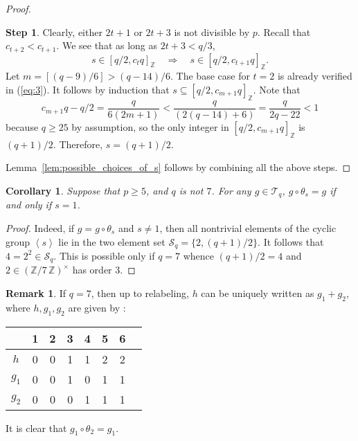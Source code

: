 \documentclass{amsart}[11pt]
\newtheorem{cor}[thm]{Corollary}
\theoremstyle{definition}
\newtheorem{rem}[thm]{Remark}
\newtheorem{step}{Step}
\numberwithin{equation}{section}
\theoremstyle{notitle}
\begin{document}
\begin{proof}
\begin{step}
Clearly, either $2t+1$ or $2t+3$ is not divisible by $p$. Recall that
$c_{t+2}< c_{t+1}$. We see that as long as $2t+3<q/3$,
\[ s\in [q/2, c_tq]_{\mathbb{Z}} \quad \Longrightarrow \quad s\in [q/2,
c_{t+1}q]_{\mathbb{Z}}.\] Let $m=[(q-9)/6]>(q-14)/6$. The base case for
$t=2$ is already verified in (\ref{eq:3}). It follows by induction
that $s\subseteq [q/2, c_{m+1}q]_{\mathbb{Z}}$. Note that
\[ c_{m+1}q-q/2= \frac{q}{6(2m+1)}<
\frac{q}{(2(q-14)+6)}=\frac{q}{2q-22}<1\] because $q\geq 25$ by
assumption, so the only integer in $[q/2, c_{m+1}q]_{\mathbb{Z}}$ is
$(q+1)/2$. Therefore, $s=(q+1)/2$. 
  \end{step}
Lemma~\ref{lem:possible_choices_of_s} follows by combining all the
above steps. 
\end{proof}
\begin{cor}\label{cor:primitive_cm_type}
  Suppose that $p\geq 5$, and $q$ is not $7$. For any $g\in {\mathscr{T}}_q$,
  $g\circ \theta_s=g$ if and only if $s=1$. 
\end{cor}
\begin{proof}
  Indeed, if $g=g\circ \theta_s$ and $s\neq 1$, then all nontrivial
  elements of the cyclic group ${\left\langle {s} \right\rangle}$ lie in the two element set
  ${\mathscr{S}}_q=\{2, (q+1)/2\}$.  It follows that $4=2^2\in {\mathscr{S}}_q$. This is
  possible only if $q=7$ whence $(q+1)/2=4$ and $2\in {(\mathbb{Z}/ {7}\, \mathbb{Z})^\times}$ has
  order 3.
\end{proof}

\begin{rem}\label{rem:case-q-is-7}
  If $q=7$, then up to relabeling, $h$ can be uniquely written as
  $g_1+g_2$, where $h, g_1, g_2$ are given by :
  \begin{center}
  \begin{tabular}{|c||c|c|c|c|c|c|c|}
\hline
    & 1 & 2 & 3 & 4 & 5 & 6 \\
\hline
  $h$ & 0 & 0 & 1 & 1& 2 & 2\\
  $g_1$& 0 & 0 & 1 & 0& 1 & 1 \\
  $g_2$& 0 & 0 & 0 & 1 & 1 & 1\\
\hline
  \end{tabular}
  \end{center}
It is clear that $g_1\circ \theta_2= g_1$. 
\end{rem}
\end{document}
